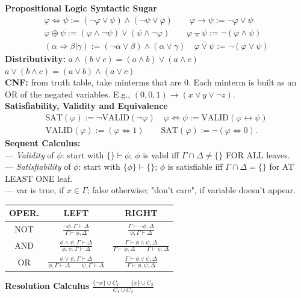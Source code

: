 \documentclass{article}
\begin{document}
\begin{multicols}{4}
\textbf{Propositional Logic Syntactic Sugar} 
\begin{gather*} 
{\varphi \Leftrightarrow \psi := (\neg \varphi \vee \psi) \wedge (\neg \psi \vee \varphi)} \qquad {\varphi \rightarrow \psi := \neg \varphi \vee \psi} \\
{\varphi \oplus \psi := (\varphi \wedge \neg \psi) \vee (\psi \wedge \neg \varphi) }\qquad {\varphi \barwedge \psi := \neg (\varphi \wedge \psi)} \\
{(\alpha \Rightarrow \beta | \gamma) := ( \neg \alpha \vee \beta) \wedge (\alpha \vee \gamma)} \quad {\varphi \bar{\vee}\psi := \neg (\varphi \vee \psi)}
\end{gather*}
\textbf{Distributivity:} ${a \wedge ( b \vee c ) = (a \wedge b) \vee (a \wedge c)}$
${a \vee ( b \wedge c ) = (a \vee b) \wedge (a \vee c)}$ \\
\textbf{CNF:} from truth table, take minterms that are 0. 
Each minterm is built as an OR of the negated variables. E.g., ${(0, 0, 1) \rightarrow (x \vee y \vee \neg z)}$. \\
\textbf{Satisfiability, Validity and Equivalence}
\begin{gather*}
\text{SAT}(\varphi) := \neg \text{VALID}(\neg \varphi) \quad \varphi \Leftrightarrow \psi := \text{VALID}(\varphi \leftrightarrow \psi) \\
\text{VALID}(\varphi) := (\varphi \Leftrightarrow 1) \qquad \text{SAT}(\varphi) := \neg(\varphi \Leftrightarrow 0).
\end{gather*}
\textbf{Sequent Calculus:}\\
---  \textit{Validity} of $\phi$: start with $\{\} \vdash {\phi}$;  $\phi$ is valid iff $\Gamma \cap \Delta \neq \{\}$ FOR ALL leaves.\\
--- \textit{Satisfiability} of $\phi$: start with $\{\phi\} \vdash \{\}$; $\phi$ is satisfiable iff $\Gamma \cap \Delta = \{\}$ for AT LEAST ONE leaf.\\
---  var is true, if $x \in \Gamma$; false otherwise; "don't care", if variable doesn't appear.
\begin{tabular}{|c|c|c|}
\hline
OPER. & LEFT & RIGHT \\ \hline
NOT & $\frac{\neg \phi,\Gamma \vdash \Delta}{\Gamma \vdash \phi, \Delta}$ & $\frac{\Gamma \vdash \neg \phi, \Delta}{\phi, \Gamma \vdash \Delta}$ \\ \hline
AND & $\frac{\phi \wedge \psi,\Gamma \vdash \Delta}{\phi, \psi,\Gamma \vdash \Delta}$ & $\frac{\Gamma \vdash \phi \wedge \psi, \Delta}{\Gamma \vdash \phi,\Delta \qquad \Gamma \vdash \psi,\Delta}$\\ \hline
OR & $\frac{\phi \vee \psi,\Gamma \vdash \Delta}{\phi,\Gamma \vdash \Delta \qquad \psi,\Gamma \vdash \Delta}$ & $\frac{\Gamma \vdash \phi \vee \psi, \Delta}{\Gamma \vdash \phi, \psi, \Delta}$ \\ \hline
\end{tabular}
\textbf{Resolution Calculus} $\frac{\{\neg x \} \cup C_1 \qquad \{x \} \cup C_2 }{C_1 \cup C_2}$


\end{multicols}
\end{document}
